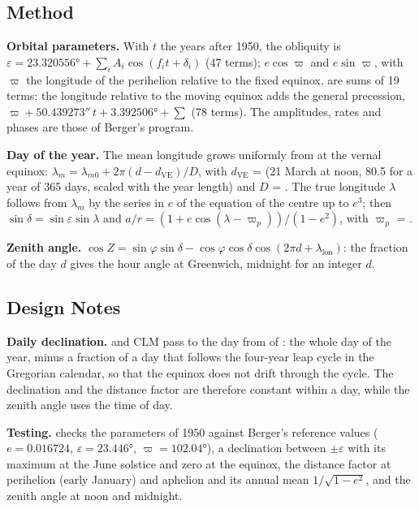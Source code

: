\subsection{Method}

\textbf{Orbital parameters.} With $t$ the years after 1950, the obliquity
is $\varepsilon = 23.320556° + \sum_i A_i\cos(f_it + \delta_i)$ (47
terms); $e\cos\varpi$ and $e\sin\varpi$, with $\varpi$ the longitude of the
perihelion relative to the fixed equinox, are sums of 19 terms; the
longitude relative to the moving equinox adds the general precession,
$\varpi + 50.439273''\,t + 3.392506° + \sum$ (78 terms). The amplitudes,
rates and phases are those of Berger's program.

\textbf{Day of the year.} The mean longitude grows uniformly from
 at the vernal equinox:
$\lambda_m = \lambda_{m0} + 2\pi(d - d_\text{VE})/D$, with $d_\text{VE}$ =
 (21 March at noon, 80.5 for a year of 365 days,
scaled with the year length) and $D$ = . The true longitude
$\lambda$ follows from $\lambda_m$ by the series in $e$ of the equation of
the centre up to $e^3$; then
$\sin\delta = \sin\varepsilon\sin\lambda$ and
$a/r = (1+e\cos(\lambda-\varpi_p))/(1-e^2)$, with
$\varpi_p$ = .

\textbf{Zenith angle.}
$\cos Z = \sin\varphi\sin\delta - \cos\varphi\cos\delta\cos(2\pi d +
\lambda_\text{lon})$: the fraction of the day $d$ gives the hour angle at
Greenwich, midnight for an integer $d$.

\subsection{Design Notes}

\textbf{Daily declination.}  and CLM pass to
 the day from  of : the
whole day of the year, minus a fraction of a day that follows the
four-year leap cycle in the Gregorian calendar, so that the equinox does
not drift through the cycle. The declination and the distance factor are
therefore constant within a day, while the zenith angle uses the time of
day.

\textbf{Testing.}  checks the
parameters of 1950 against Berger's reference values ($e = 0.016724$,
$\varepsilon = 23.446°$, $\varpi = 102.04°$), a declination between
$\pm\varepsilon$ with its maximum at the June solstice and zero at the
equinox, the distance factor at perihelion (early January) and aphelion
and its annual mean $1/\sqrt{1-e^2}$, and the zenith angle at noon and
midnight.


